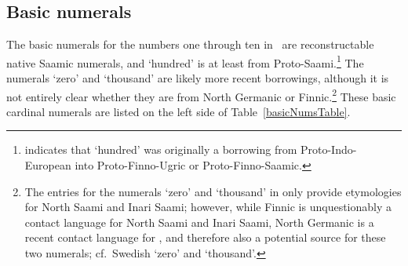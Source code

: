 \subsection{Basic numerals}\label{basicNums}
The basic numerals for the numbers one through ten in \PS\ are reconstructable native Saamic numerals, and  ‘hundred’ is at least from Proto-Saami.\footnote{\citet[234-235]{Sammallahti1998} indicates that  ‘hundred’ was originally a borrowing from Proto-Indo-European into Proto-Finno-Ugric or Proto-Finno-Saamic.} 
The numerals  ‘zero’ and  ‘thousand’ are likely more recent borrowings, although it is not entirely clear whether they are from North Germanic or %
Finnic.\footnote{The entries for the numerals ‘zero’ and ‘thousand’ in \cite{alguWebsite} only provide etymologies for North Saami and Inari Saami; however, while Finnic is unquestionably a contact language for North Saami and Inari Saami, North Germanic is a recent contact language for \PS, and therefore also a potential source for these two numerals; cf.~Swedish  ‘zero’ and  ‘thousand’. } 
These basic cardinal numerals are listed on the left side of Table~\vref{basicNumsTable}.
